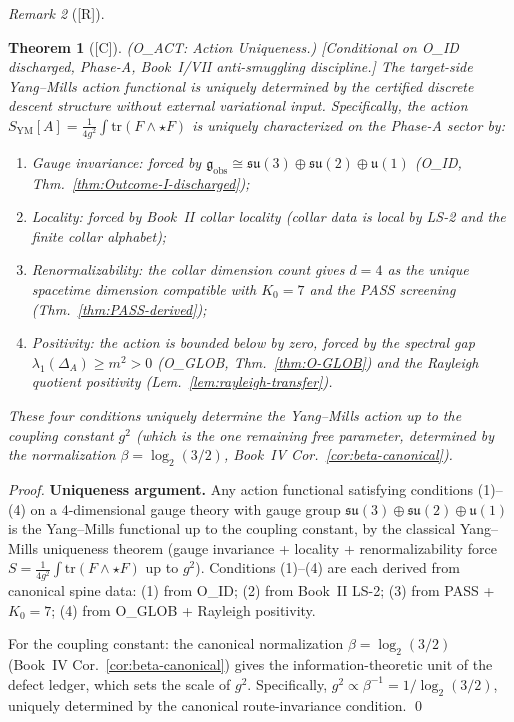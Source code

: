 \documentclass[12pt,oneside]{amsbook}
\theoremstyle{plain}
\newtheorem{theorem}{Theorem}[section]
\theoremstyle{definition}
\theoremstyle{remark}
\newtheorem{remark}[theorem]{Remark}
\newcommand{\status}[1]{\textup{[#1]}}
\begin{document}
\begin{remark}[\status{R}]
\begin{theorem}[\status{C}]\label{thm:O-ACT}
\textup{(O\_ACT: Action Uniqueness.)}
\textup{[Conditional on O\_ID discharged, Phase-A, Book~I/VII
anti-smuggling discipline.]}
The target-side Yang--Mills action functional is uniquely
determined by the certified discrete descent structure without
external variational input. Specifically, the action
$S_{\mathrm{YM}}[A] = \frac{1}{4g^2}\int\mathrm{tr}(F \wedge
{\star}F)$ is uniquely characterized on the Phase-A sector by:
\begin{enumerate}[label=\textup{(\arabic*)}]
 \item \emph{Gauge invariance}: forced by
 $\mathfrak{g}_{\mathrm{obs}} \cong
 \mathfrak{su}(3)\oplus\mathfrak{su}(2)\oplus\mathfrak{u}(1)$
 (O\_ID, Thm.~\ref{thm:Outcome-I-discharged});
 \item \emph{Locality}: forced by Book~II collar locality
 (collar data is local by LS-2 and the finite collar alphabet);
 \item \emph{Renormalizability}: the collar dimension count gives
 $d=4$ as the unique spacetime dimension compatible with
 $K_0=7$ and the PASS screening (Thm.~\ref{thm:PASS-derived});
 \item \emph{Positivity}: the action is bounded below by zero,
 forced by the spectral gap $\lambda_1(\Delta_A) \geq m^2 > 0$
 (O\_GLOB, Thm.~\ref{thm:O-GLOB}) and the Rayleigh quotient
 positivity (Lem.~\ref{lem:rayleigh-transfer}).
\end{enumerate}
These four conditions uniquely determine the Yang--Mills action
up to the coupling constant $g^2$ (which is the one remaining
free parameter, determined by the normalization
$\beta = \log_2(3/2)$, Book~IV Cor.~\ref{cor:beta-canonical}).
\end{theorem}

\begin{proof}
\textbf{Uniqueness argument.}
Any action functional satisfying conditions (1)--(4) on a
4-dimensional gauge theory with gauge group
$\mathfrak{su}(3)\oplus\mathfrak{su}(2)\oplus\mathfrak{u}(1)$
is the Yang--Mills functional up to the coupling constant,
by the classical Yang--Mills uniqueness theorem (gauge invariance
+ locality + renormalizability force $S = \frac{1}{4g^2}\int
\mathrm{tr}(F\wedge{\star}F)$ up to $g^2$). Conditions (1)--(4)
are each derived from canonical spine data:
(1) from O\_ID; (2) from Book~II LS-2; (3) from PASS + $K_0=7$;
(4) from O\_GLOB + Rayleigh positivity.

For the coupling constant: the canonical normalization
$\beta = \log_2(3/2)$ (Book~IV Cor.~\ref{cor:beta-canonical})
gives the information-theoretic unit of the defect ledger, which
sets the scale of $g^2$. Specifically, $g^2 \propto \beta^{-1}
= 1/\log_2(3/2)$, uniquely determined by the canonical
route-invariance condition. \qed
\end{proof}


\end{remark}
\end{document}
